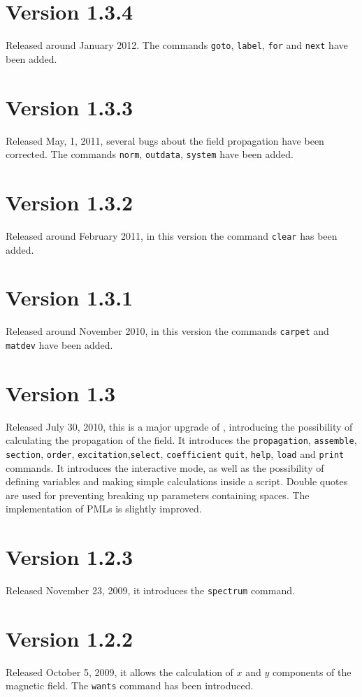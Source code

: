 \section{Version 1.3.4}
Released around January 2012. The commands \lstinline!goto!, \lstinline!label!, \lstinline!for! and \lstinline!next! have been added.

\section{Version 1.3.3}
Released May, 1, 2011, several bugs about the field propagation have been corrected.  The commands \lstinline!norm!, \lstinline!outdata!, \lstinline!system! have been added.

\section{Version 1.3.2}
Released around February 2011, in this version the command \lstinline!clear! has been added.

\section{Version 1.3.1}
Released around November 2010, in this version the commands \lstinline!carpet! and \lstinline!matdev! have been added.

\section{Version 1.3}
Released July 30, 2010, this is a major upgrade of \afmm, introducing the possibility of calculating the propagation of the field. It introduces the \lstinline!propagation!, \lstinline!assemble!, \lstinline!section!, \lstinline!order!, \lstinline!excitation!,\lstinline!select!, \lstinline!coefficient! \lstinline!quit!, \lstinline!help!, \lstinline!load! and \lstinline!print! commands. It introduces the interactive mode, as well as the possibility of defining variables and making simple calculations inside a script. Double quotes are used for preventing breaking up parameters containing spaces. The implementation of PMLs is slightly improved.


\section{Version 1.2.3}
Released November 23, 2009, it introduces the \lstinline!spectrum! command.

\section{Version 1.2.2}
Released October 5, 2009, it allows the calculation of $x$ and $y$ components of the magnetic field. The \lstinline!wants! command has been introduced.

